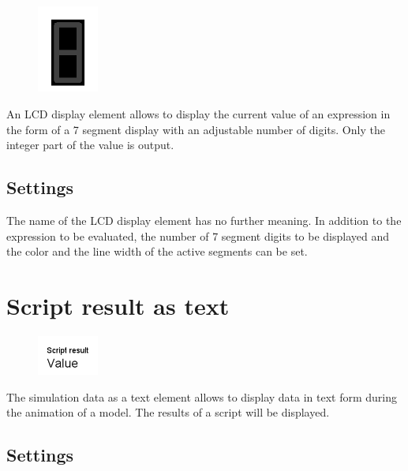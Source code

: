 \begin{figure}
\vspace{-22pt}
\includegraphics[width=2cm]{imageModelElementAnimationLCD.png}
\vspace{-22pt}
\end{figure}

An LCD display element allows to display the current value of an expression
in the form of a 7 segment display with an adjustable number of digits.
Only the integer part of the value is output. 

\subsection*{Settings}

The name of the LCD display element has no further meaning.
In addition to the expression to be evaluated, the number of
7 segment digits to be displayed and the color and the line width of the active
segments can be set.


\section{Script result as text}
\label{ref:ModelElementAnimationTextJS}

\begin{figure}
\vspace{-22pt}
\includegraphics[width=2cm]{imageModelElementAnimationTextJS.png}
\vspace{-22pt}
\end{figure}

The simulation data as a text element allows to display data in text form during the animation of a model.
The results of a script will be displayed.

\subsection*{Settings}

